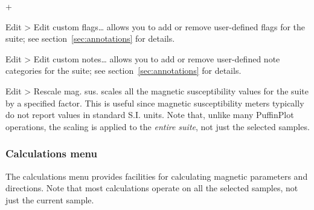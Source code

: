 \documentclass[a4paper,british]{article}
\newcommand{\menuitemlabel}[1]{%
\mbox{\textsf{#1}}\hfil}
\newenvironment{menuitemlist}%
{\begin{list}{}{%
\renewcommand{\makelabel}{\menuitemlabel}%
\setlength{\labelwidth}{35pt}%
\setlength{\leftmargin}%
             {\labelwidth+\labelsep}}}%
{\end{list}}
\newcommand{\submenu}{ \textgreater{} } %
\begin{document}
\begin{menuitemlist}

\item[Edit\submenu Edit custom flags\ldots] allows you to add or remove
user-defined flags for the suite; see section~\ref{sec:annotations}
for details.

\item[Edit\submenu Edit custom notes\ldots] allows you to add or remove
  user-defined note categories for the suite; see
  section~\ref{sec:annotations} for details.

\item[Edit\submenu Rescale mag. sus.] scales all the magnetic
susceptibility values for the suite by a specified factor. This is
useful since magnetic susceptibility meters typically do not report
values in standard S.I. units. Note that, unlike many PuffinPlot operations,
the scaling is applied to the {\em entire suite}, not just the selected
samples.

\end{menuitemlist}

\subsubsection{\label{sec:functions-calcs}Calculations menu}

The calculations menu provides facilities for calculating magnetic
parameters and directions. Note that most calculations operate on
all the selected samples, not just the current sample.
\end{document}
